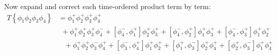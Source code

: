 {%
Now expand and correct each time-ordered product term by term:
    \begin{align*}
        T\left\{\phi_1 \phi_2 \phi_3 \phi_4\right\} &= \phi_1^+ \phi_2^+ \phi_3^+ \phi_4^+\\[5pt]
        &\hspace{5pt}+\phi_1^+ \phi_2^+ \phi_3^+ \phi_4^-+ \left[\phi_4^-, \phi_1^+\right] \phi_2^+ \phi_3^++ \left[\phi_4^-, \phi_2^+\right] \phi_1^+ \phi_3^++ \left[\phi_4^-, \phi_3^+\right] \phi_1^+ \phi_2^+\\[5pt]
        &\hspace{10pt}+\phi_1^+ \phi_2^+ \phi_3^- \phi_4^++ \left[\phi_3^-, \phi_4^+\right] \phi_1^+ \phi_2^++ \left[\phi_1^+, \phi_3^- \right] \phi_2^+ \phi_4^++ \left[\phi_2^+, \phi_3^- \right] \phi_1^+ \phi_4^+\\[5pt]

\end{align*}}
